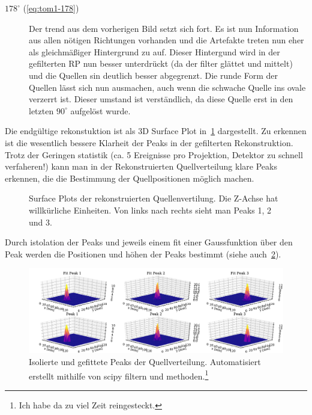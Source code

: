 \documentclass[slug=PET, room=Andreas-Schubert-Bau\,\ 424A, supervisor=Carsten\ Bittrich, coursedate=10.\ 01.\ 2020]{../../Lab_Report_LaTeX/lab_report}
\begin{document}
\begin{description}
\item[\(178^\circ\) (\ref{eq:tom1-178})] Der trend aus dem vorherigen
  Bild setzt sich fort. Es ist nun Information aus allen n\"otigen
  Richtungen vorhanden und die Artefakte treten nun eher als
  gleichm\"a\ss{}iger Hintergrund zu auf. Dieser Hintergund wird in
  der gefilterten RP nun besser unterdr\"uckt (da der filter gl\"attet
  und mittelt) und die Quellen sin deutlich besser abgegrenzt. Die
  runde Form der Quellen l\"asst sich nun ausmachen, auch wenn die
  schwache Quelle ins ovale verzerrt ist. Dieser umstand ist
  verst\"andlich, da diese Quelle erst in den letzten \(90^\circ\)
  aufgel\"ost wurde.
\end{description}

Die endg\"ultige rekonstuktion ist als 3D Surface Plot
in~\ref{fig:tom1-3dplot} dargestellt. Zu erkennen ist die wesentlich
bessere Klarheit der Peaks in der gefilterten Rekonstruktion. Trotz
der Geringen statistik (ca. 5 Ereignisse pro Projektion, Detektor zu
schnell verfaheren!)  kann man in der Rekonstruierten Quellverteilung
klare Peaks erkennen, die die Bestimmung der Quellpositionen m\"oglich
machen.

\begin{figure}[h]\centering
  
  \caption[Rekonstruierte Quellenverteilung]{Surface Plots der
    rekonstruierten Quellenvertilung. Die Z-Achse hat willk\"urliche
    Einheiten. Von links nach rechts sieht man Peaks 1, 2 und 3.}
  \label{fig:tom1-3dplot}
\end{figure}

Durch istolation der Peaks und jeweils einem fit einer Gaussfunktion
\"uber den Peak werden die Positionen und h\"ohen der Peaks bestimmt
(siehe auch~\ref{fig:tom1-filtered_fit}).

\begin{figure}[h]\centering
  \includegraphics[width=\textwidth]{../auswertung/figs/tom1/filtered_fit.pdf}
  \caption[Fit der Peaks]{Isolierte und gefittete Peaks der
    Quellverteilung. Automatisiert erstellt mithilfe von scipy
    filtern und methoden.\footnote{Ich habe da zu viel Zeit reingesteckt.}}
  \label{fig:tom1-filtered_fit}
\end{figure}
\end{document}
